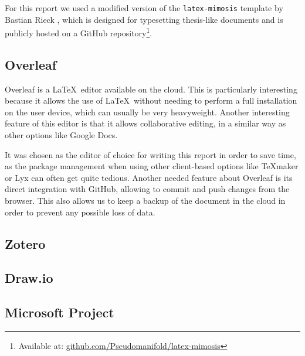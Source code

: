 For this report we used a modified version of the \texttt{latex-mimosis} template by Bastian Rieck \cite{rieck_latex-mimosis_2022}, which is designed for typesetting thesis-like documents and is publicly hosted on a GitHub repository\footnote{Available at: \url{github.com/Pseudomanifold/latex-mimosis}}.

\subsection{Overleaf}

Overleaf \cite{noauthor_documentation_nodate} is a \LaTeX\ editor available on the cloud. This is particularly interesting because it allows the use of \LaTeX\ without needing to perform a full installation on the user device, which can usually be very heavyweight. Another interesting feature of this editor is that it allows collaborative editing, in a similar way as other options like Google Docs.

It was chosen as the editor of choice for writing this report in order to save time, as the package management when using other client-based options like TeXmaker or Lyx can often get quite tedious. Another needed feature about Overleaf is its direct integration with GitHub, allowing to commit and push changes from the browser. This also allows us to keep a backup of the document in the cloud in order to prevent any possible loss of data.

\subsection{Zotero}

\subsection{Draw.io}

\subsection{Microsoft Project}